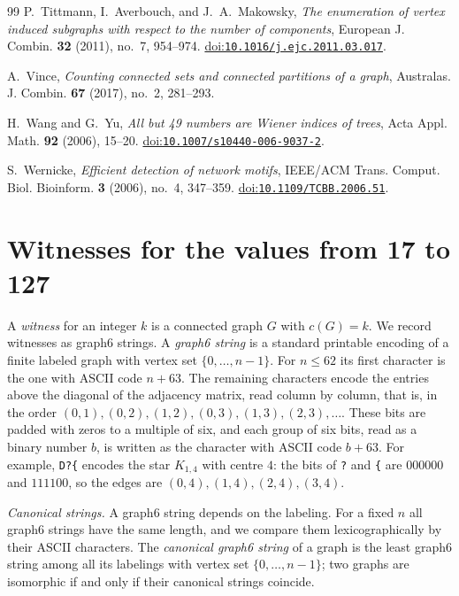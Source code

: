 \documentclass[11pt]{amsart}
\theoremstyle{definition}
\theoremstyle{remark}
\newcommand{\doi}[1]{\href{https://doi.org/#1}{doi:\nolinkurl{#1}}}
\begin{document}
\begin{thebibliography}{99}
P.~Tittmann, I.~Averbouch, and J.~A.~Makowsky,
\emph{The enumeration of vertex induced subgraphs with respect to the number of components},
European J. Combin. \textbf{32} (2011), no.~7, 954--974.
\doi{10.1016/j.ejc.2011.03.017}.

A.~Vince,
\emph{Counting connected sets and connected partitions of a graph},
Australas. J. Combin. \textbf{67} (2017), no.~2, 281--293.

H.~Wang and G.~Yu,
\emph{All but 49 numbers are Wiener indices of trees},
Acta Appl. Math. \textbf{92} (2006), 15--20.
\doi{10.1007/s10440-006-9037-2}.

S.~Wernicke,
\emph{Efficient detection of network motifs},
IEEE/ACM Trans. Comput. Biol. Bioinform. \textbf{3} (2006), no.~4, 347--359.
\doi{10.1109/TCBB.2006.51}.

\end{thebibliography}

\appendix

\section{Witnesses for the values from 17 to 127}\label{app:witnesses}

A \emph{witness} for an integer $k$ is a connected graph $G$ with $c(G)=k$. We record witnesses as graph6 strings. A \emph{graph6 string} is a standard printable encoding of a finite labeled graph with vertex set $\{0,\dots,n-1\}$. For $n\le62$ its first character is the one with ASCII code $n+63$. The remaining characters encode the entries above the diagonal of the adjacency matrix, read column by column, that is, in the order $(0,1),(0,2),(1,2),(0,3),(1,3),(2,3),\dots$. These bits are padded with zeros to a multiple of six, and each group of six bits, read as a binary number $b$, is written as the character with ASCII code $b+63$. For example, \verb!D?{! encodes the star $K_{1,4}$ with centre $4$: the bits of \verb!?! and \verb!{! are $000000$ and $111100$, so the edges are $(0,4),(1,4),(2,4),(3,4)$.

\emph{Canonical strings.} A graph6 string depends on the labeling. For a fixed $n$ all graph6 strings have the same length, and we compare them lexicographically by their ASCII characters. The \emph{canonical graph6 string} of a graph is the least graph6 string among all its labelings with vertex set $\{0,\dots,n-1\}$; two graphs are isomorphic if and only if their canonical strings coincide.
\end{document}
